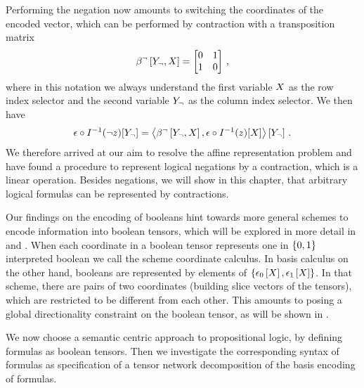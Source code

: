 Performing the negation now amounts to switching the coordinates of the encoded vector, which can be performed by contraction with a transposition matrix
\begin{align*}
    \beta^{\lnot}\left[Y_{\lnot},X\right] =
    \begin{bmatrix}
        0 & 1 \\
        1 & 0
    \end{bmatrix} \, ,
\end{align*}
where in this notation we always understand the first variable $X$ as the row index selector and the second variable $Y_{\lnot}$ as the column index selector.
We then have
\begin{align*}
    \epsilon\circ I^{-1}(\lnot z)[Y_{\lnot}]
    = \left\langle \beta^{\lnot}\left[Y_{\lnot},X\right],\epsilon\circ I^{-1}(z)[X]\right\rangle \left[ Y_{\lnot} \right] \, .
\end{align*}
We therefore arrived at our aim to resolve the affine representation problem and have found a procedure to represent logical negations by a contraction, which is a linear operation.
Besides negations, we will show in this chapter, that arbitrary logical formulas can be represented by contractions.


Our findings on the encoding of booleans hint towards more general schemes to encode information into boolean tensors, which will be explored in more detail in  and .
When each coordinate in a boolean tensor represents one in $\{0,1\}$ interpreted boolean we call the scheme coordinate calculus.
In basis calculus on the other hand, booleans are represented by elements of $\{\epsilon_0\left[X\right],\epsilon_1\left[X\right]\}$.
In that scheme, there are pairs of two coordinates (building slice vectors of the tensors), which are restricted to be different from each other.
This amounts to posing a global directionality constraint on the boolean tensor, as will be shown in .


We now choose a semantic centric approach to propositional logic, by defining formulas as boolean tensors.
Then we investigate the corresponding syntax of formulas as specification of a tensor network decomposition of the basis encoding of formulas.

